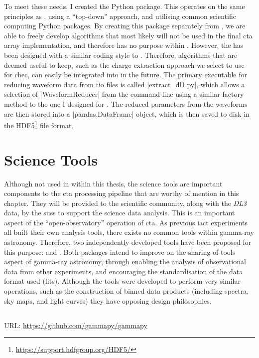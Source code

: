 To meet these needs, I created the  Python package. This operates on the same principles as , using a ``top-down'' approach, and utilising common scientific computing Python packages. By creating this package separately from , we are able to freely develop algorithms that most likely will not be used in the final \gls{cta} array implementation, and therefore has no purpose within .  However, the  has been designed with a similar coding style to . Therefore, algorithms that are deemed useful to keep, such as the charge extraction approach we select to use for \gls{chec}, can easily be integrated into  in the future. The primary executable for reducing waveform data from \gls{tio} files is called |extract_dl1.py|, which allows a selection of |WaveformReducer| from the command-line using a similar factory method to the one I designed for . The reduced parameters from the waveforms are then stored into a |pandas.DataFrame| object, which is then saved to disk in the HDF5\footnote{\url{https://support.hdfgroup.org/HDF5/}} file format.

\section{Science Tools}

Although not used in within this thesis, the science tools are important components to the \gls{cta} processing pipeline that are worthy of mention in this chapter. They will be provided to the scientific community, along with the \textit{DL3} data, by the \gls{suss} to support the science data analysis. This is an important aspect of the ``open-observatory'' operation of \gls{cta}.  As previous \gls{iact} experiments all built their own analysis tools, there exists no common tools within gamma-ray astronomy. Therefore, two independently-developed tools have been proposed for this purpose:  and . Both packages intend to improve on the sharing-of-tools aspect of gamma-ray astronomy, through enabling the analysis of observational data from other experiments, and encouraging the standardisation of the data format used (\gls{fits}). Although the tools were developed to perform very similar operations, such as the construction of binned data products (including spectra, sky maps, and light curves) they have opposing design philosophies.

\subsection{}
\vspace{-0.7em}
\noindent \hspace{\parindent} {\tiny URL: \url{https://github.com/gammapy/gammapy} \par}

